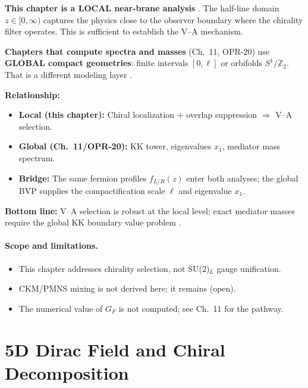 \begin{tcolorbox}[colback=blue!5!white, colframe=blue!50!black,
    title=\textbf{Local vs Global Geometry Map}]
\textbf{This chapter is a LOCAL near-brane analysis} \tagP{}. The half-line
domain $z \in [0, \infty)$ captures the physics close to the observer boundary
where the chirality filter operates. This is sufficient to establish the V--A
mechanism.

\textbf{Chapters that compute spectra and masses} (Ch.~11, OPR-20) use
\textbf{GLOBAL compact geometries}: finite intervals $[0, \ell]$ or orbifolds
$S^1/\mathbb{Z}_2$. That is a different modeling layer \tagDc{}.

\textbf{Relationship:}
\begin{itemize}[nosep]
    \item \textbf{Local (this chapter):} Chiral localization + overlap suppression
          $\Rightarrow$ V--A selection. \tagDc{}
    \item \textbf{Global (Ch.~11/OPR-20):} KK tower, eigenvalues $x_1$, mediator
          mass spectrum. \tagDc{}
    \item \textbf{Bridge:} The same fermion profiles $f_{L/R}(z)$ enter both
          analyses; the global BVP supplies the compactification scale $\ell$
          and eigenvalue $x_1$. \tagDc{}
\end{itemize}

\textbf{Bottom line:} V--A selection is robust at the local level; exact mediator
masses require the global KK boundary value problem \tagDc{}.
\end{tcolorbox}

\paragraph{Scope and limitations.}
\begin{itemize}[nosep]
    \item This chapter addresses chirality selection, not SU(2)$_L$ gauge unification.
    \item CKM/PMNS mixing is not derived here; it remains (open).
    \item The numerical value of $G_F$ is not computed; see Ch.~11 for the pathway.
\end{itemize}

\section{5D Dirac Field and Chiral Decomposition}
\label{sec:ch9_dirac}

